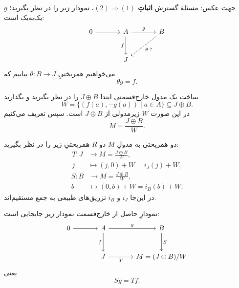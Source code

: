 \begin{frame}[t]{جهت عکس: مسئلهٔ گسترش}
  \label{lec18:splitting-injective-problem}
  \textbf{اثباتِ $(2)\Rightarrow(1)$.}
  نمودار زیر را در نظر بگیرید؛ $g$ یک‌به‌یک است:
  \[
    \begin{tikzcd}[ampersand replacement=\&,column sep=large,row sep=large]
      0 \arrow[r] \& A \arrow[r,"g"] \arrow[d,"f"']
        \& B \arrow[dl,dashed,"\theta\;?"] \\
      \& J \&
    \end{tikzcd}
  \]
  می‌خواهیم همریختیِ $\theta:B\to J$ بیابیم که
  \[
    \theta g=f.
  \]
\end{frame}

\begin{frame}[t]{ساخت یک مدول خارج‌قسمتی}
  \label{lec18:pushout-quotient}
  ابتدا $J\oplus B$ را در نظر بگیرید و بگذارید
  \[
    W=\{(f(a),-g(a))\mid a\in A\}\subseteq J\oplus B.
  \]
  در این صورت $W$ زیرمدولی از $J\oplus B$ است.
  سپس تعریف می‌کنیم
  \[
    M=\frac{J\oplus B}{W}.
  \]
\end{frame}

\begin{frame}[t]{دو همریختی به مدولِ $M$}
  \label{lec18:pushout-maps}
  دو $R$-همریختیِ زیر را در نظر بگیرید:
  \[
    \begin{aligned}
      T:J&\longrightarrow M=\frac{J\oplus B}{W},\\
      j&\longmapsto(j,0)+W=i_J(j)+W,
    \end{aligned}
  \]
  \[
    \begin{aligned}
      S:B&\longrightarrow M=\frac{J\oplus B}{W},\\
      b&\longmapsto(0,b)+W=i_B(b)+W.
    \end{aligned}
  \]
  در این‌جا $i_J$ و $i_B$ تزریق‌های طبیعی به جمع مستقیم‌اند.
\end{frame}

\begin{frame}[t]{نمودارِ حاصل از خارج‌قسمت}
  \label{lec18:pushout-square}
  نمودار زیر جابجایی است:
  \[
    \begin{tikzcd}[ampersand replacement=\&,column sep=large,row sep=large]
      0 \arrow[r] \& A \arrow[r,"g"] \arrow[d,"f"']
        \& B \arrow[d,"S"] \\
      \& J \arrow[r,"T"'] \& M=(J\oplus B)/W
    \end{tikzcd}
  \]
  یعنی
  \[
    Sg=Tf.
  \]
\end{frame}

